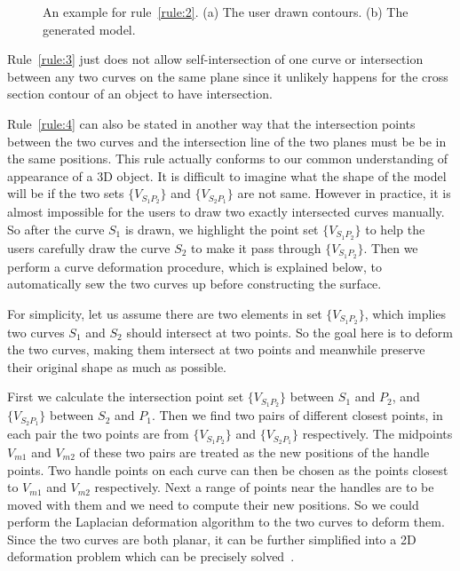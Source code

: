 \begin{figure} [htbp]
{\begin{minipage}[b]{0.22\textwidth}
    \end{minipage}}
  \caption{An example for rule~\ref{rule:2}. (a) The user drawn contours. (b) The generated model.}
  \label{fig:rule2} %
\end{figure}

Rule~\ref{rule:3} just does not allow self-intersection of one curve or intersection between any two curves on the same plane since it unlikely happens for the cross section contour of an object to have intersection.

Rule~\ref{rule:4} can also be stated in another way that the intersection points between the two curves and the intersection line of the two planes must be be in the same positions. This rule actually conforms to our common understanding of appearance of a 3D object. It is difficult to imagine what the shape of the model will be if the two sets $\{V_{S_1P_2}\}$ and $\{V_{S_2P_1}\}$ are not same. However in practice, it is almost impossible for the users to draw two exactly intersected curves manually. So after the curve $S_1$ is drawn, we highlight the point set $\{V_{S_1P_2}\}$ to help the users carefully draw the curve $S_2$ to make it pass through $\{V_{S_1P_2}\}$. Then we perform a curve deformation procedure, which is explained below, to automatically sew the two curves up before constructing the surface.

For simplicity, let us assume there are two elements in set $\{V_{S_1P_2}\}$, which implies two curves $S_1$ and $S_2$ should intersect at two points. So the goal here is to deform the two curves, making them intersect at two points and meanwhile preserve their original shape as much as possible.

First we calculate the intersection point set $\{V_{S_1P_2}\}$ between $S_1$ and $P_2$, and $\{V_{S_2P_1}\}$ between $S_2$ and $P_1$. Then we find two pairs of different closest points, in each pair the two points are from $\{V_{S_1P_2}\}$ and $\{V_{S_2P_1}\}$ respectively. The midpoints $V_{m1}$ and $V_{m2}$ of these two pairs are treated as the new positions of the handle points. Two handle points on each curve can then be chosen as the points closest to $V_{m1}$ and $V_{m2}$ respectively. Next a range of points near the handles are to be moved with them and we need to compute their new positions. So we could perform the Laplacian deformation algorithm to the two curves to deform them. Since the two curves are both planar, it can be further simplified into a 2D deformation problem which can be precisely solved~\cite{ESA07}.

